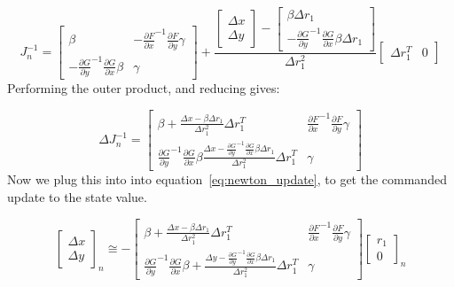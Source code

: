 \documentclass{article}
\begin{document}
\begin{equation}
  J_n^{-1} =
  \begin{bmatrix}
    \beta &
    - {\frac{\partial F}{\partial x}}^{-1} \frac{\partial F}{\partial y} \gamma \\
    - {\frac{\partial G}{\partial y}}^{-1} \frac{\partial G}{\partial x} \beta &
    \gamma
  \end{bmatrix}
  +
  \frac{
  \begin{bmatrix}
    \Delta x \\
    \Delta y
  \end{bmatrix}
   -
  \begin{bmatrix}
    \beta \Delta r_1 \\
    - {\frac{\partial G}{\partial y}}^{-1} \frac{\partial G}{\partial x} \beta \Delta r_1
  \end{bmatrix}
  }{\Delta r_{1}^2}
  \begin{bmatrix}
    \Delta r_{1}^T &
    0
  \end{bmatrix}
\end{equation}
Performing the outer product, and reducing gives:

\begin{equation}
  \Delta J_n^{-1} =
  \begin{bmatrix}
    \beta + \frac{\Delta x - \beta \Delta r_{1}}{\Delta r_{1}^2 } \Delta r_{1}^T &
    {\frac{\partial F}{\partial x}}^{-1} \frac{\partial F}{\partial y} \gamma \\
    {\frac{\partial G}{\partial y}}^{-1} \frac{\partial G}{\partial x} \beta \frac{\Delta x - {\frac{\partial G}{\partial y}}^{-1} \frac{\partial G}{\partial x} \beta \Delta r_{1}}{\Delta r_{1}^2 } \Delta r_{1}^T  &
    \gamma
  \end{bmatrix}
\end{equation}
Now we plug this into into equation~\eqref{eq:newton_update}, to get the commanded update to the state value.

\begin{equation}
  {
  \begin{bmatrix}
    \Delta x \\
    \Delta y
  \end{bmatrix}
  }_n \cong -
  \begin{bmatrix}
    \beta + \frac{\Delta x - \beta \Delta r_{1}}{\Delta r_{1}^2 } \Delta r_{1}^T &
    {\frac{\partial F}{\partial x}}^{-1} \frac{\partial F}{\partial y} \gamma \\
    {\frac{\partial G}{\partial y}}^{-1} \frac{\partial G}{\partial x} \beta + \frac{\Delta y - {\frac{\partial G}{\partial y}}^{-1} \frac{\partial G}{\partial x} \beta \Delta r_{1}}{\Delta r_{1}^2 } \Delta r_{1}^T  &
    \gamma
  \end{bmatrix}
  {
  \begin{bmatrix}
    r_1 \\
    0
  \end{bmatrix}
  }_n
\end{equation}
\end{document}
